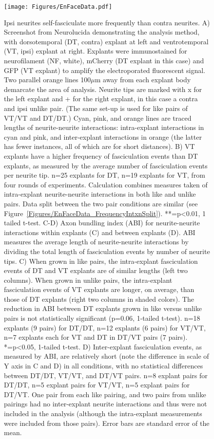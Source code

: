 \begin{figure}[hbtp]
    \begin{center}
        \texttt{[image: Figures/EnFaceData.pdf]}
        \caption[Ipsi neurites self-fasciculate more frequently than contra neurites.]
        {Ipsi neurites self-fasciculate more frequently than contra neurites.
		A) Screenshot from Neurolucida demonstrating the analysis method, with dorsotemporal (DT, contra) explant at left and ventrotemporal (VT, ipsi) explant at right.
		Explants were immunostained for neurofilament (NF, white), mCherry (DT explant in this case) and GFP (VT explant) to amplify the electroporated fluorescent signal.
		Two parallel orange lines 100$\mu$m away from each explant body demarcate the area of analysis.
		Neurite tips are marked with x for the left explant and + for the right explant, in this case a contra and ipsi unlike pair.
		(The same set-up is used for like pairs of VT/VT and DT/DT.)
		Cyan, pink, and orange lines are traced lengths of neurite-neurite interactions: intra-explant interactions in cyan and pink, and inter-explant interactions in orange (the latter has fewer instances, all of which are for short distances).
		B) VT explants have a higher frequency of fasciculation events than DT explants, as measured by the average number of fasciculation events per neurite tip.
		n=25 explants for DT, n=19 explants for VT, from four rounds of experiments.
		Calculation combines measures taken of intra-explant neurite-neurite interactions in both like and unlike pairs.
		Data split between the two pair conditions are similar (see Figure~\ref{Figures/EnFaceData_FrequencyIntxnSplit}).
		**=p<0.01, 1 tailed t-test.
		C-D) Axon bundling index (ABI) for neurite-neurite interactions within explants (C) and between explants (D).
		ABI measures the average length of neurite-neurite interactions by dividing the total length of fasciculation events by number of neurite tips.
		C) When grown in like pairs, the intra-explant fasciculation events of DT and VT explants are of similar lengths (left two columns).
		When grown in unlike pairs, the intra-explant fasciculation events of VT explants are longer, on average, than those of DT explants (right two columns in shaded colors).
		The reduction in ABI between DT explants grown in like versus unlike pairs is not statistically significant (p=0.06, 1-tailed t-test).
		n=18 explants (9 pairs) for DT/DT, n=12 explants (6 pairs) for VT/VT, n=7 explants each for VT and DT in DT/VT pairs (7 pairs).
		*=p<0.05, 1-tailed t-test.
		D) Inter-explant fasciculation events, as measured by ABI, are relatively short (note the difference in scale of Y axis in C and D) in all conditions, with no statistical differences between DT/DT, VT/VT, and DT/VT pairs.
		n=8 explant pairs for DT/DT, n=5 explant pairs for VT/VT, n=5 explant pairs for DT/VT.
		One pair from each like pairing, and two pairs from unlike pairings had no inter-explant neurite interactions and thus were not included in the analysis (although the intra-explant measurements were included from those pairs).
		Error bars are standard error of the mean.
		}
        \label{Figures/EnFaceData}
    \end{center}
\end{figure}


